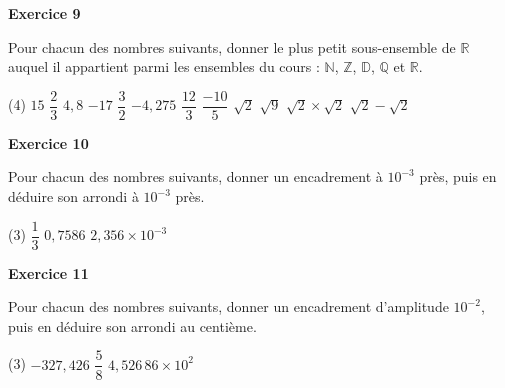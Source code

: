 \documentclass[a4paper,11pt]{article}
\newenvironment{exercice}[1]{%
  \Needspace{6\baselineskip}\par\bigskip\noindent\textbf{Exercice #1}\par\smallskip\noindent\ignorespaces
}{%
  \par
}
\newcommand{\droiteonze}{%
  \begin{tikzpicture}[x=0.55cm,baseline=-0.5ex]
    \draw[{Latex[length=2mm]}-{Latex[length=2mm]}] (-2.6,0) -- (10.6,0);
    \foreach \i in {-2,...,10} {
      \draw (\i,0.08) -- (\i,-0.08);
      \$\bullet$ \quad Calculatrice autorisée \quaenode[below] at (\i,-0.08) {\scriptsize$\i$};
    }
  \end{tikzpicture}%
}
\begin{document}
% 

\begin{exercice}{9}
Pour chacun des nombres suivants, donner le plus petit sous-ensemble de $\mathbb{R}$ auquel il appartient parmi les ensembles du cours : $\mathbb{N}$, $\mathbb{Z}$, $\mathbb{D}$, $\mathbb{Q}$ et $\mathbb{R}$.
\begin{tasks}(4)
\task $15$
\task $\dfrac{2}{3}$
\task $4{,}8$
\task $-17$
\task $\dfrac{3}{2}$
\task $-4{,}275$
\task $\dfrac{12}{3}$
\task $\dfrac{-10}{5}$
\task $\sqrt{2}$
\task $\sqrt{9}$
\task $\sqrt{2}\times\sqrt{2}$
\task $\sqrt{2}-\sqrt{2}$
\end{tasks}
\end{exercice}

\begin{exercice}{10}
Pour chacun des nombres suivants, donner un encadrement à $10^{-3}$ près, puis en déduire son arrondi à $10^{-3}$ près.
\begin{tasks}(3)
\task $\dfrac{1}{3}$
\task $0{,}7586$
\task $2{,}356\times 10^{-3}$
\end{tasks}
\end{exercice}

\begin{exercice}{11}
Pour chacun des nombres suivants, donner un encadrement d'amplitude $10^{-2}$, puis en déduire son arrondi au centième.
\begin{tasks}(3)
\task $-327{,}426$
\task $\dfrac{5}{8}$
\task $4{,}526\,86\times 10^{2}$
\end{tasks}
\end{exercice}
\end{document}
